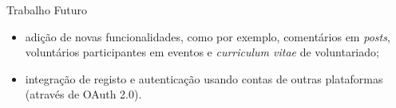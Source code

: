 \begin{frame}{Trabalho Futuro}
	
\vspace*{-3em}
	
\begin{itemize}
	\item adição de novas funcionalidades, como por exemplo, comentários em \textit{posts}, voluntários participantes em eventos e \textit{curriculum vitae} de voluntariado;
	\item integração de registo e autenticação usando contas de outras plataformas (através de OAuth 2.0).
\end{itemize}

\end{frame}